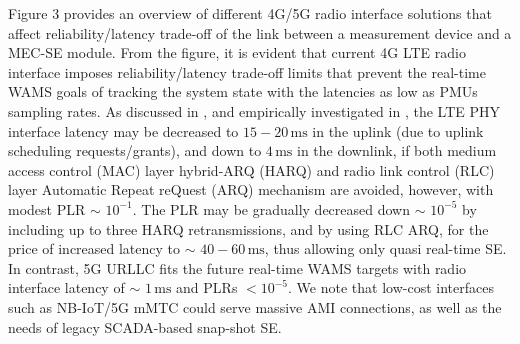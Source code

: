 \documentclass[journal]{IEEEtran}
\begin{document}
Figure 3 provides an overview of different 4G/5G radio interface solutions that affect reliability/latency trade-off of the link between a measurement device and a MEC-SE module. From the figure, it is evident that current 4G LTE radio interface imposes reliability/latency trade-off limits that prevent the real-time WAMS goals of tracking the system state with the latencies as low as PMUs sampling rates. As discussed in \cite{wiemann}, and empirically investigated in \cite{rupp}, the LTE PHY interface latency may be decreased to $15-20\,\mathrm{ms}$ in the uplink (due to uplink scheduling requests/grants), and down to $4\,\mathrm{ms}$ in the downlink, if both medium access control (MAC) layer hybrid-ARQ (HARQ) and radio link control (RLC) layer Automatic Repeat reQuest (ARQ) mechanism are avoided, however, with modest PLR $\sim$ $10^{-1}$. The PLR may be gradually decreased down $\sim$ $10^{-5}$ by including up to three HARQ retransmissions, and by using RLC ARQ, for the price of increased latency to $\sim$ $40-60\,\mathrm{ms}$, thus allowing only quasi real-time SE. In contrast, 5G URLLC fits the future real-time WAMS targets with radio interface latency of $\sim$ $1\,\mathrm{ms}$ and PLRs $<10^{-5}$. We note that low-cost interfaces such as NB-IoT/5G mMTC could serve massive AMI connections, as well as the needs of legacy SCADA-based snap-shot SE.
\end{document}
